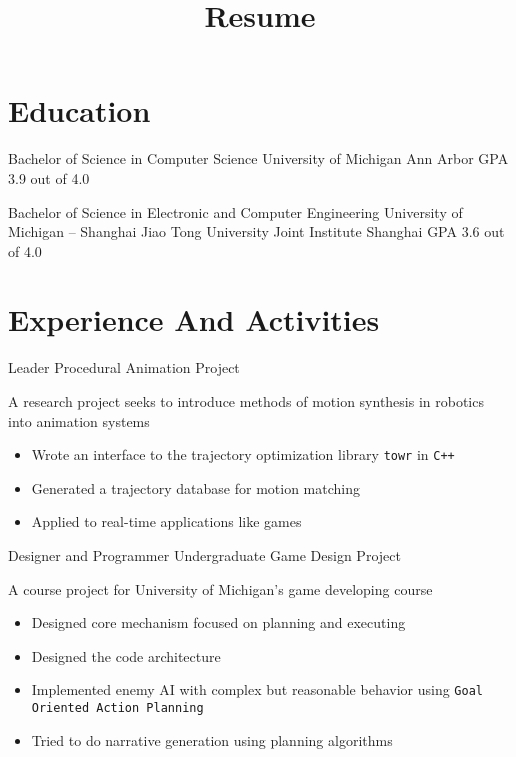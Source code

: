 \documentclass[10pt, a4paper, sans]{moderncv}
\title{Resume}
\begin{document}
\makecvtitle

\section{Education}
{Bachelor of Science in Computer Science}
{University of Michigan}
{Ann Arbor}
{GPA 3.9 out of 4.0}
{}

{Bachelor of Science in Electronic and Computer Engineering}
{University of Michigan -- Shanghai Jiao Tong University Joint Institute}
{Shanghai}
{GPA 3.6 out of 4.0}
{}

\section{Experience And Activities}
{Leader}
{Procedural Animation Project}
{}{}
{A research project seeks to introduce methods of motion synthesis in robotics into animation systems
	\begin{itemize}
		\item Wrote an interface to the trajectory optimization library \texttt{towr} in \texttt{C++}
		\item Generated a trajectory database for motion matching
		\item Applied to real-time applications like games
	\end{itemize}
}

{Designer and Programmer}
{Undergraduate Game Design Project}
{}{}
{A course project for University of Michigan's game developing course
	\begin{itemize}
		\item Designed core mechanism focused on planning and executing
		\item Designed the code architecture
		\item Implemented enemy AI with complex but reasonable behavior using \texttt{Goal Oriented Action Planning}
		\item Tried to do narrative generation using planning algorithms
	\end{itemize}
}
\end{document}

